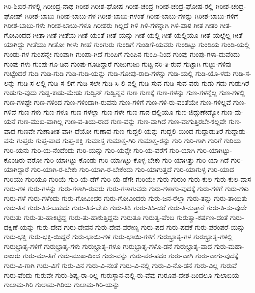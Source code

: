 {ಗಿರಿ-ಶಿಖರ-ಗಳಲ್ಲಿ
ಗಿರೀಂದ್ರ-ನಾಥ
ಗಿರೀಶ
ಗಿರೀಶ-ಘೋಷ
ಗಿರೀಶ-ಚಂದ್ರ
ಗಿರೀಶ-ಚಂದ್ರ-ಘೋಷ-ರಲ್ಲಿ
ಗಿರೀಶ-ಚಂದ್ರ-ಘೋಷ್
ಗಿರೀಶ-ಬಾಬು
ಗಿರೀಶ-ಬಾಬು-ಗಳ
ಗಿರೀಶ-ಬಾಬು-ಗಳಂತೆ
ಗಿರೀಶ-ಬಾಬು-ಗಳನ್ನು
ಗಿರೀಶ-ಬಾಬು-ಗಳಿಗೆ
ಗಿರೀಶ-ಬಾಬು-ಗಳು
ಗಿರೀಶ-ಬಾಬು-ಗಳೂ
ಗಿರೀಶರು
ಗಿಲ್ಲದೆ
ಗಿಳಿ
ಗಿಳಿ-ಗಳನ್ನಾಗಿ
ಗಿಳಿ-ಪಾಠ
ಗೀತ
ಗೀತಂ
ಗೀತ-ಗೋವಿಂದದ
ಗೀತಾ
ಗೀತೆ
ಗೀತೆಯ
ಗೀತೆ-ಯಂತೆ
ಗೀತೆ-ಯನ್ನು
ಗೀತೆ-ಯಲ್ಲಿ
ಗೀತೆ-ಯಲ್ಲಿಯೂ
ಗೀತೆ-ಯಲ್ಲೆಲ್ಲ
ಗೀತೆ-ಯಾಗಿದ್ದು
ಗೀತೆಯು
ಗೀತೋ
ಗೀಳು
ಗೀಹೆ
ಗುಂಗುರು
ಗುಂಡಿಗೆ
ಗುಂಡಿಗೆ-ಯವರು
ಗುಂಡಿಟ್ಟು
ಗುಂಡಿಯ
ಗುಂಡಿ-ಯಲ್ಲಿ
ಗುಂಡು-ಗಳ
ಗುಂಪನ್ನೇ
ಗುಂಪಾಗಿ
ಗುಂಪಾ-ಗಿದೆ
ಗುಂಪಿಗೆ
ಗುಂಪಿನ
ಗುಂಪಿ-ನಿಂದ
ಗುಂಪು
ಗುಂಪು-ಗಳಾ-ದುವೆಂದು
ಗುಂಪು-ಗಳು
ಗುಂಪು-ಗೂ-ಡಿದ
ಗುಂಪು-ಗೂಡಿದ್ದಾರೆ
ಗುಜುಗುಜು
ಗುಟ್ಟ-ನರಿ-ತಿ-ರುವೆ
ಗುಟ್ಟಾಗಿ
ಗುಟ್ಟು-ಗಳಿವು
ಗುಟ್ಟೆಂದರೆ
ಗುಡಿ
ಗುಡಿ-ಗುಡಿ
ಗುಡಿ-ಗುಡಿ-ಯನ್ನು
ಗುಡಿ-ಗೋಪು-ರಾದಿ-ಗಳನ್ನು
ಗುಡಿ-ಯಲ್ಲಿ
ಗುಡಿ-ಯೊ-ಳದು
ಗುಡಿ-ಸ-ಲನ್ನು
ಗುಡಿ-ಸ-ಲಲ್ಲಿ
ಗುಡಿ-ಸ-ಲಿಗೆ
ಗುಡಿ-ಸಲೇ
ಗುಡಿ-ಸಿ-ಲಿ-ನಲ್ಲಿ
ಗುಡಿ-ಸುವ
ಗುಡಿ-ಸುವ-ವರು
ಗುಡು-ಗದು
ಗುಡುಗಿರೆ
ಗುಡುಗು-ವುದು
ಗುಡ್ಡ-ಕಾಡು-ಮೇಡು
ಗುಡ್ವಿನ್
ಗುಡ್ವಿನ್ನನ
ಗುಣ
ಗುಣಕ್ಕೆ
ಗುಣ-ಗಳನ್ನು
ಗುಣ-ಗಳನ್ನೆಲ್ಲ
ಗುಣ-ಗಳಲ್ಲಿ
ಗುಣ-ಗಳಷ್ಟೇ
ಗುಣ-ಗಳಿಂದ
ಗುಣ-ಗಳಿಂದಾಗಿ-ರುವನು
ಗುಣ-ಗಳಿಗೆ
ಗುಣ-ಗಳಿ-ರು-ವಂತೆಯೇ
ಗುಣ-ಗಳಿಲ್ಲವೆ
ಗುಣ-ಗಳಿವೆ
ಗುಣ-ಗಳು
ಗುಣ-ಗಳೂ
ಗುಣ-ಗಳೆಲ್ಲಾ
ಗುಣ-ಗಳೇ
ಗುಣ-ಗಾನ-ದಲ್ಲಿಯೂ
ಗುಣ-ಜಿದ್ಗುಣೇಡ್ಯೋ
ಗುಣ-ಮ-ಯನೆ
ಗುಣ-ಮುಖ-ವಾಗಿಲ್ಲ
ಗುಣ-ವ-ತಿಯ-ರಾದ
ಗುಣ-ವನ್ನು
ಗುಣ-ವಾಗಿದೆ
ಗುಣ-ವಾಗುತ್ತಿರಬೇ-ಕಲ್ಲವೇ
ಗುಣ-ವಾದ
ಗುಣವೇ
ಗುಣಾತೀತ-ವಾಗಿ-ದೆಯೋ
ಗುಣಾವ-ಗುಣ
ಗುದ್ದಲಿ-ಯನ್ನು
ಗುದ್ದಲಿ-ಯಿಂದ
ಗುದ್ದಾಡುತಿರೆ
ಗುದ್ದಾಡು-ವನು
ಗುಪ್ತರು
ಗುಪ್ತ-ವಾದ
ಗುಪ್ತ-ಶಕ್ತಿ
ಗುಮಾಸ್ತ
ಗುಮಾಸ್ತ-ಗಿರಿ
ಗುಮಾಸ್ತ-ರನ್ನು
ಗುರಿ
ಗುರಿ-ಗಾಗಿ
ಗುರಿಗೆ
ಗುರಿಯ
ಗುರಿ-ಯನು
ಗುರಿ-ಯ-ನೆಂದೆಂದು
ಗುರಿ-ಯನ್ನು
ಗುರಿ-ಯನ್ನೇ
ಗುರಿ-ಯ-ವರೆಗೆ
ಗುರಿ-ಯಾಗಿ
ಗುರಿ-ಯಾಗಿಟ್ಟು-ಕೊಂಡಿರು-ವರೋ
ಗುರಿ-ಯಾಗಿಟ್ಟು-ಕೊಂಡು
ಗುರಿ-ಯಾಗಿಟ್ಟು-ಕೊಳ್ಳ-ಬೇಕು
ಗುರಿ-ಯಾಗಿತ್ತು
ಗುರಿ-ಯಾ-ಗಿದೆ
ಗುರಿ-ಯಾಗಿದ್ದಾರೆ
ಗುರಿ-ಯಾಗಿ-ರ-ಬೇಕು
ಗುರಿ-ಯಾಗಿ-ರ-ಬೇಕೆಂದು
ಗುರಿ-ಯಾಗುತ್ತದೆ
ಗುರಿ-ಯಾಗುಳ್ಳ
ಗುರಿ-ಯಾದ
ಗುರಿಯು
ಗುರಿಯೂ
ಗುರಿಯೆ
ಗುರಿ-ಯೆ-ಡೆಗೆ
ಗುರಿ-ಯೆ-ಡೆಗೇ
ಗುರಿಯೇ
ಗುರು
ಗುರುಂ
ಗುರು-ಕುಲ
ಗುರು-ಕುಲ-ವಾಸ
ಗುರು-ಗಳ
ಗುರು-ಗಳನ್ನು
ಗುರು-ಗಳಾಗಿ-ರುವರು
ಗುರು-ಗಳಾಗುವರು
ಗುರು-ಗಳಾಗು-ವುದಕ್ಕೆ
ಗುರು-ಗಳಿಗೆ
ಗುರು-ಗಳು
ಗುರು-ಗಳೆ
ಗುರು-ಗಳೆಂದು
ಗುರು-ಗೋವಿಂದರ
ಗುರು-ಗೋವಿಂದರು
ಗುರು-ಜನ-ರೆಲ್ಲಾ
ಗುರು-ತನ್ನು
ಗುರು-ತಾಯಿತು
ಗುರು-ತಿನ
ಗುರು-ತಿಸ-ಬಹುದು
ಗುರು-ತಿಸ-ಬೇಕು
ಗುರು-ತಿಸಿ
ಗುರು-ತಿಸಿ-ದರೆ
ಗುರು-ತಿ-ಸುತ್ತಾರೆ
ಗುರು-ತಿ-ಸು-ವುದೇ
ಗುರುತು
ಗುರು-ತು-ಹಾಕಿಟ್ಟಿದ್ದ
ಗುರು-ತು-ಹಾಕುತ್ತಿದ್ದನು
ಗುರುತೂ
ಗುರುತ್ವ-ವೆಂಬ
ಗುರುತ್ವಾ-ಕರ್ಷಣ-ದಂತೆ
ಗುರು-ದಕ್ಷಿಣೆ-ಯನ್ನು
ಗುರು-ದೇವ
ಗುರು-ದೇವನ
ಗುರು-ದೇವ-ವರೇಣ್ಯ
ಗುರು-ಪದ
ಗುರು-ಪದಕೆ
ಗುರು-ಪರಂಪರೆ-ಯನ್ನು
ಗುರು-ಭಕ್ತಿ
ಗುರು-ಭಕ್ತಿ-ಯಿದ್ದರೆ
ಗುರು-ಭಾಯಿ-ಗಳ
ಗುರು-ಭಾಯಿ-ಗಳಿಗೆ
ಗುರುಭ್ರಾತೃ-ಗಳ
ಗುರುಭ್ರಾತೃ-ಗಳಲ್ಲಿ
ಗುರುಭ್ರಾತೃ-ಗಳಿಗೆ
ಗುರುಭ್ರಾತೃ-ಗಳು
ಗುರುಭ್ರಾತೃ-ಗಳೂ
ಗುರುಭ್ರಾತೃ-ಗಳೊ-ಡನೆ
ಗುರುಭ್ರಾತೃ-ವಾದ
ಗುರು-ಮಹಾ-ರಾಜರು
ಗುರು-ಮಾ-ತಿಗೆ
ಗುರು-ಮುಖ-ದಿಂದ
ಗುರು-ವನ್ನು
ಗುರು-ವರ-ಪದಂ
ಗುರು-ವಾಗಿ
ಗುರು-ವಾಗು-ವುದಕ್ಕೆ
ಗುರು-ವಿ-ಗಾಗಿ
ಗುರು-ವಿಗೆ
ಗುರು-ವಿನ
ಗುರು-ವಿ-ನಂತೆ
ಗುರು-ವಿ-ನಲ್ಲಿ
ಗುರು-ವಿ-ನೊ-ಡನೆ
ಗುರು-ವಿಲ್ಲ
ಗುರುವೆ
ಗುರು-ವೆಂದು
ಗುರುವೇ
ಗುರು-ಶಿಷ್ಯ-ರಾ-ರಿಲ್ಲ
ಗುರುಸ್ಥಾನ-ದಲ್ಲಿ-ರು-ವೆವು
ಗುರೂಪ-ದೇಶ-ದಿಂದಲೂ
ಗುಲಾಬಿಯ
ಗುಲಾಮ-ಗಿರಿ
ಗುಲಾಮ-ಗಿರಿಯ
ಗುಲಾಮ-ಗಿರಿ-ಯನ್ನು
}
